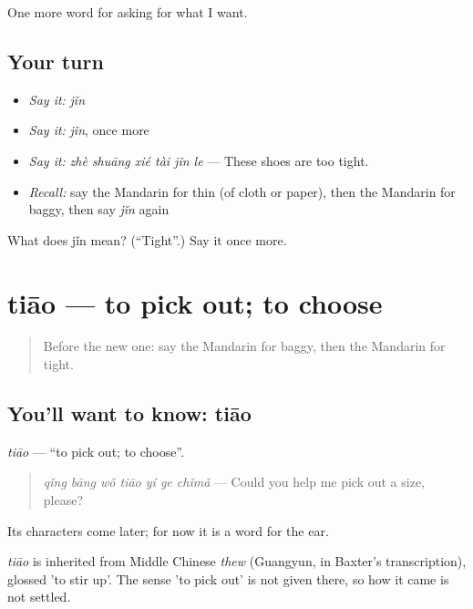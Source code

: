 \begin{grammarlens}[title={What you've built}]
One more word for asking for what I want.
\end{grammarlens}

\subsection*{Your turn}
\begin{itemize}
\raggedright
  \item \emph{Say it:} \emph{jǐn}
  \item \emph{Say it:} \emph{jǐn}, once more
  \item \emph{Say it:} \emph{zhè shuāng xié tài jǐn le} — These shoes are too tight.
  \item \emph{Recall:} say the Mandarin for thin (of cloth or paper), then the Mandarin for baggy, then say \emph{jǐn} again
\end{itemize}

\begin{tcolorbox}[breakable,colback=teal!4,colframe=teal!35!black,title={Before you move on}]
What does jǐn mean? (\textquotedblleft{}Tight\textquotedblright{}.) Say it once more.
\end{tcolorbox}
\section[tiāo]{tiāo — to pick out; to choose}

\label{lesson:ZH-C199-tiao-pick}



\begin{quote}
Before the new one: say the Mandarin for baggy, then the Mandarin for tight.
\end{quote}

\subsection*{You'll want to know: tiāo}
\emph{tiāo} — \textquotedblleft{}to pick out; to choose\textquotedblright{}.

\begin{quote}
\emph{qǐng bāng wǒ tiāo yí ge chǐmǎ} — Could you help me pick out a size, please?
\end{quote}

Its characters come later; for now it is a word for the ear.

\begin{cousinweb}
\emph{tiāo} is inherited from Middle Chinese \emph{thew} (Guangyun, in Baxter's transcription), glossed 'to stir up'. The sense 'to pick out' is not given there, so how it came is not settled.
\end{cousinweb}

